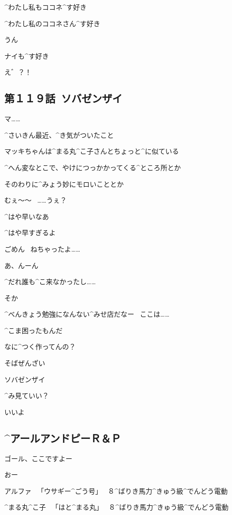 \Alpha ^{わたし}{私}もココネ^{す}{好}き

\page
\Maruko ^{わたし}{私}のココネさん^{す}{好}き

\Alpha うん

\page
\Maruko ナイも^{す}{好}き

\Alpha え゛？！


\subsection{第１１９話\ ソバゼンザイ}

\page[119]
\Alpha マ……

\page[121]
\Alpha ^{さいきん}{最近}、^{き}{気}がついたこと

\page
\Alpha マッキちゃんは^{まる}{丸}^{こ}{子}さんとちょっと^{に}{似}ている

\Alpha ^{へん}{変}なとこで、やけにつっかかってくる^{ところ}{所}とか

\Alpha そのわりに^{みょう}{妙}にモロいこととか

\page
\Makki むぇ〜〜
\ ……うぇ？

\page[128]
\Alpha ^{はや}{早}いなあ

\page
\Alpha ^{はや}{早}すぎるよ

\page
\Makki ごめん
\ ねちゃったよ……

\Alpha あ、んーん

\Alpha ^{だれ}{誰}も^{こ}{来}なかったし……

\page
\Makki そか

\Makki ^{べんきょう}{勉強}になんない^{みせ}{店}だなー
\ ここは……

\Alpha ^{こま}{困}ったもんだ

\Makki なに^{つく}{作}ってんの？

\Alpha そばぜんざい

\page
\Makki ソバゼンザイ

\Makki ^{み}{見}ていい？

\Alpha いいよ


\subsection{^{アールアンドピー}{Ｒ＆Ｐ}}

\page[133]
\Kokone ゴール、ここですよー

\Alpha おー

\Sign アルファ
\ 「ウサギー^{ごう}{号}」
\ ８^{ばりき}{馬力}^{きゅう}{級}^{でんどう}{電動}

\Sign ^{まる}{丸}^{こ}{子}
\ 「はと^{まる}{丸}」
\ ８^{ばりき}{馬力}^{きゅう}{級}^{でんどう}{電動}

